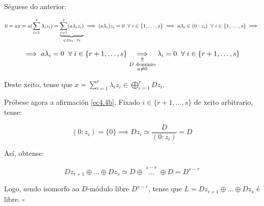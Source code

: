 \documentclass[twoside]{report}
\theoremstyle{mystyle}
\begin{document}
\noindent Séguese do anterior:

$$0 = ax = a(\displaystyle \sum_{i = 1}^{s} \lambda_{i}z_{i}) = \underbrace{\sum_{i=1}^{s}(a\lambda_{i}z_{i})}_{\in Dz_{i} \hspace{2mm} \forall i} \implies (a\lambda_{i})z_{i} = 0 \hspace{2mm} \forall \hspace{1mm} i \in \{1, \dots, s\} \implies a\lambda_{i} \in (0 : z_{i}) \hspace{2mm} \forall \hspace{1mm} i \in \{1, \dots, s\} \implies$$

$$
\implies a\lambda_{i} = 0 \hspace{2mm} \forall \hspace{1mm} i \in \{r+1, \dots, s\} \underset{\substack{\Uparrow \\ D \text{ dominio} \\ a \neq 0}}{\implies} \lambda_{i} = 0 \hspace{2mm} \forall \hspace{1mm} i \in \{r+1, \dots, s\}
$$

\vspace{3mm}

\noindent Deste xeito, tense que $x = \displaystyle \sum_{i = 1}^{r}\lambda_{i}z_{i} \in \bigoplus_{i = 1}^{r}Dz_{i}$.\\

\vspace{3mm}

\noindent Próbese agora a afirmación \eqref{ec4.4b}. Fixado $i \in \{r+1, \dots, s\}$ de xeito arbitrario, tense:

$$(0 : z_{i}) = \{0\} \implies Dz_{i} \simeq \displaystyle \frac{D}{(0:z_{i})} = D$$

\vspace{3mm}

\noindent Así, obtense:

$$\displaystyle Dz_{r+1} \oplus \dots \oplus Dz_{s} \simeq D \oplus \overset{\substack{s - r\\ \qquad}}{\dots} \oplus D = D^{s-r}$$

\vspace{3mm}

\noindent Logo, sendo isomorfo ao $D$-módulo libre $D^{s-r}$, tense que $L = Dz_{r+1} \oplus \dots \oplus Dz_{s}$ é libre. $\square$\\

\vspace{3mm}
\end{document}
